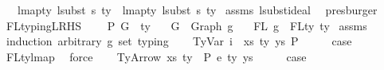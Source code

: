 \begin{isabellebody}
\ \ \ {\isachardoublequoteopen}lmap{\isacharunderscore}{\kern0pt}ty\ {\isacharparenleft}{\kern0pt}lsubst\ s{\isacharparenright}{\kern0pt}\ ty\ {\isacharequal}{\kern0pt}\ lmap{\isacharunderscore}{\kern0pt}ty\ {\isacharparenleft}{\kern0pt}lsubst\ s{}{\isacharparenright}{\kern0pt}\ ty{\isachardoublequoteclose}\isanewline
%
\isadelimproof
%
\endisadelimproof
%
\isatagproof
{}\isamarkupfalse%
\ assms{\isacharparenleft}{\kern0pt}{}{\isacharcomma}{\kern0pt}{}{\isacharcomma}{\kern0pt}{}{\isacharcomma}{\kern0pt}{}{\isacharparenright}{\kern0pt}\ lsubst{\isacharunderscore}{\kern0pt}ideal\ \isamarkupfalse%
\ presburger%
\endisatagproof
{\isafoldproof}%
%
\isadelimproof
\isanewline
%
\endisadelimproof
\isanewline
\isanewline
\isanewline
{}\isamarkupfalse%
\ FL{\isacharunderscore}{\kern0pt}typing{\isacharunderscore}{\kern0pt}LRHS{\isacharcolon}{\kern0pt}\isanewline
\ \ \ {\isachardoublequoteopen}{\isasymGamma}\ {\isasymturnstile}{\isacharbraceleft}{\kern0pt}P{\isacharbraceright}{\kern0pt}\ G\ {\isacharcolon}{\kern0pt}\ ty{\isachardoublequoteclose}\isanewline
\ \ \ {\isachardoublequoteopen}G\ {\isacharequal}{\kern0pt}\ Graph\ g{\isachardoublequoteclose}\isanewline
\ \ \ {\isachardoublequoteopen}FL\ g\ {\isacharequal}{\kern0pt}\ FLty\ ty{\isachardoublequoteclose}\isanewline
%
\isadelimproof
%
\endisadelimproof
%
\isatagproof
{}\isamarkupfalse%
\ assms\isanewline
{}\isamarkupfalse%
\ {\isacharparenleft}{\kern0pt}induction\ arbitrary{\isacharcolon}{\kern0pt}\ g\ set{\isacharcolon}{\kern0pt}\ typing{\isacharparenright}{\kern0pt}\isanewline
\ \ \isamarkupfalse%
\ {\isacharparenleft}{\kern0pt}TyVar\ i\ {\isasymGamma}\ xs\ ty\ ys\ P{\isacharparenright}{\kern0pt}\isanewline
\ \ \isamarkupfalse%
\ \isamarkupfalse%
\ {\isacharquery}{\kern0pt}case\isanewline
\ \ \isamarkupfalse%
\ FL{\isacharunderscore}{\kern0pt}ty{\isacharunderscore}{\kern0pt}lmap{}\ \isamarkupfalse%
\ force\isanewline
{}\isamarkupfalse%
\isanewline
\ \ \isamarkupfalse%
\ {\isacharparenleft}{\kern0pt}TyArrow\ xs\ ty{}\ {\isasymGamma}\ P\ e\ ty{}\ ys{\isacharparenright}{\kern0pt}\isanewline
\ \ \isamarkupfalse%
\ \isamarkupfalse%
\ {\isacharquery}{\kern0pt}case\isanewline

\end{isabellebody}
